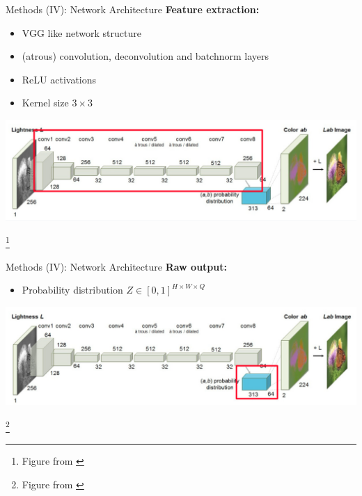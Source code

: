 \documentclass{beamer}
\newcommand\blfootnote[1]{%
  \begingroup
  \renewcommand\thefootnote{}\footnote{#1}%
  \addtocounter{footnote}{-1}%
  \endgroup
}
\begin{document}
\begin{frame}{Methods (IV): Network Architecture}
  \textbf{Feature extraction:}
    \begin{itemize}
      \item VGG like network structure
      \item (atrous) convolution, deconvolution and batchnorm layers
      \item ReLU activations
      \item Kernel size $3 \times 3$
    \end{itemize}

  \medskip

  \includegraphics[width=\linewidth]{resources/network2.jpg}

  \blfootnote{Figure from \cite{Zhang2016}}
\end{frame}

\begin{frame}{Methods (IV): Network Architecture}
  \textbf{Raw output:}
    \begin{itemize}
      \item Probability distribution $Z \in [0, 1]^{H \times W \times Q}$
    \end{itemize}

  \medskip

  \includegraphics[width=\linewidth]{resources/network3.jpg}

  \blfootnote{Figure from \cite{Zhang2016}}
\end{frame}
\end{document}
